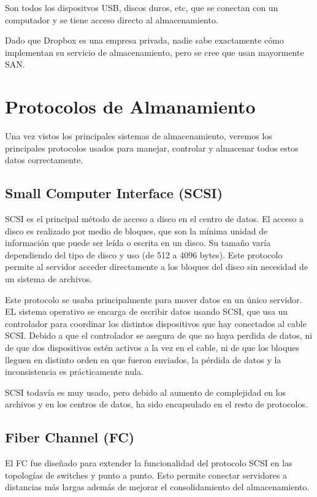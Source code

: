 Son todos los dispositvos USB, discos duros, etc, que se conectan con un computador y se tiene acceso directo al almacenamiento.


Dado que Dropbox es una empresa privada, nadie sabe exactamente cómo implementan su servicio de almacenamiento, pero se cree que usan mayormente SAN.

\section{Protocolos de Almanamiento}

Una vez vistos los principales sistemas de almacenamiento, veremos los principales protocolos usados para manejar, controlar y almacenar todos estos datos correctamente.

\subsection{Small Computer Interface (SCSI)}

SCSI es el principal método de acceso a disco en el centro de datos. El acceso a disco es realizado por medio de bloques, que son la mínima unidad de información que puede ser leída o escrita en un disco. Su tamaño varía dependiendo del tipo de disco y uso (de 512 a 4096 bytes). Este protocolo permite al servidor acceder directamente a los bloques del disco sin necesidad de un sistema de archivos.

Este protocolo se usaba principalmente para mover datos en un único servidor. EL sistema operativo se encarga de escribir datos usando SCSI, que usa un controlador para coordinar los distintos dispositivos que hay conectados al cable SCSI. Debido a que el controlador se asegura de que no haya perdida de datos, ni de que dos dispositivos estén activos a la vez en el cable, ni de que los bloques lleguen en distinto orden en que fueron enviados, la pérdida de datos y la inconsistencia es prácticamente nula.

SCSI todavía es muy usado, pero debido al aumento de complejidad en los archivos y en los centros de datos, ha sido encapsulado en el resto de protocolos.

\subsection{Fiber Channel (FC)}

El FC fue diseñado para extender la funcionalidad del protocolo SCSI en las topologías de switches y punto a punto. Esto permite conectar servidores a distancias más largas además de mejorar el consolidamiento del almacenamiento.

